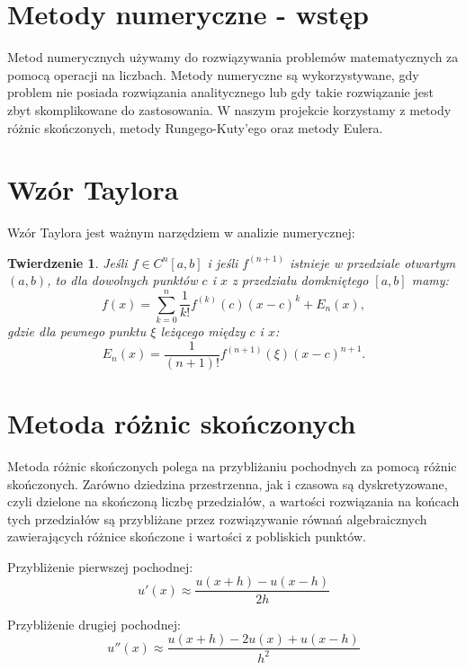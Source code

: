 \documentclass[a4paper,12pt]{article}
\newtheorem{theorem}{Twierdzenie}
\begin{document}
\section{Metody numeryczne - wstęp}
Metod numerycznych używamy do rozwiązywania problemów matematycznych za pomocą operacji na liczbach. Metody numeryczne są wykorzystywane, gdy problem nie posiada rozwiązania analitycznego lub gdy takie rozwiązanie jest zbyt skomplikowane do zastosowania. W naszym projekcie korzystamy z metody różnic skończonych, metody Rungego-Kuty'ego oraz metody Eulera.

\section{Wzór Taylora}
Wzór Taylora jest ważnym narzędziem w analizie numerycznej:
\begin{theorem}
Jeśli $f \in C^n [a,b]$ i jeśli $f^{(n+1)}$ istnieje w przedziale otwartym $(a,b)$, to dla dowolnych punktów $c$ i $x$ z przedziału domkniętego $[a,b]$ mamy:
\begin{equation}
f(x)=\sum_{k=0}^n \frac{1}{k!}f^{(k)}(c)(x-c)^k + E_n (x),
\end{equation}
gdzie dla pewnego punktu $\xi$ leżącego między $c$ i $x$:
\begin{equation}
E_n (x) = \frac{1}{(n+1)!}f^{(n+1)}(\xi)(x-c)^{n+1}.
\end{equation}
\end{theorem}

\section{Metoda różnic skończonych}
Metoda różnic skończonych polega na przybliżaniu pochodnych za pomocą różnic skończonych. Zarówno dziedzina przestrzenna, jak i czasowa są dyskretyzowane, czyli dzielone na skończoną liczbę przedziałów, a wartości rozwiązania na końcach tych przedziałów są przybliżane przez rozwiązywanie równań algebraicznych zawierających różnice skończone i wartości z pobliskich punktów.

Przybliżenie pierwszej pochodnej:
\begin{equation}
u'(x) \approx \frac{u(x+h) - u(x-h)}{2h}
\end{equation}

Przybliżenie drugiej pochodnej:
\begin{equation}
u''(x) \approx \frac{u(x+h) - 2u(x) + u(x-h)}{h^2}
\end{equation}
\end{document}
